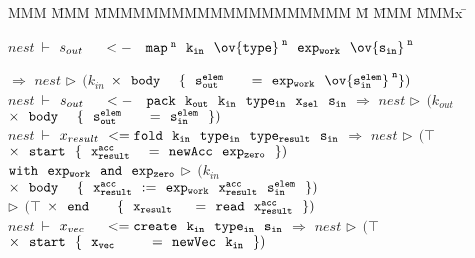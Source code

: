 \begin{tabbing}
MMM \= MMM \= MMMMMMMMMMMMMMMMMMMM \= M \= MMM \= MMMx \= \kill

 \> $nest~ \vdash$    
        \> $s_{out} ~~~~~\tt{<-}
                ~~~ \tt{map}^{\;n}
                        ~~ k_{in}
                        ~~ \ov{type}^{\;n}
                        ~~ exp_{work}
                        ~~ \ov{s_{in}}^{\;n}$

\> $\Rightarrow$ 
        \> $nest$
        \> $\rhd~~ (k_{in}$
        \> $\times~~ \tt{body}~~~~ 
                \{~~ s^{elem}_{out} ~~~~~~\tt{=}~~ exp_{work}~~ \ov{s^{elem}_{in}}^{\;n} \} )$ 
\\[1em]


 \> $nest~ \vdash$
        \> $s_{out} ~~~~~\tt{<-}
               ~~~ \tt{pack} 
                       ~~ k_{out}
                       ~~ k_{in}
                       ~~ type_{in}
                       ~~ x_{sel}
                       ~~ s_{in}$
\> $\Rightarrow$
        \> $nest$
        \> $\rhd~~ (k_{out}$
        \> $\times~~ \tt{body}~~~~ 
                \{~~ s^{elem}_{out} ~~~~~~\tt{=}~~ s^{elem}_{in} ~~\})$
\\[1em]


 \> $nest~ \vdash$
        \> $x_{result}~~  
                        \tt{<= fold}~~ k_{in}~~ type_{in}~~ type_{result}~~ s_{in}$ 
 \> $\Rightarrow$
        \> $nest$
        \> $\rhd~~ (\top$
        \> $\times~~ \tt{start}~~   
                \{~~ x^{acc}_{result} ~~~~\tt{=}~~ \tt{newAcc}~~ exp_{zero} ~~\})$
 \\[0.5ex]     


 \>     \> \hspace{5em} $\tt{with}   ~~ exp_{work}
                      ~~ \tt{and}    ~~ exp_{zero}$
 \>     \> 
        \> $\rhd~~ (k_{in}$
        \> $\times~~ \tt{body}~~~~    
                \{~~ x^{acc}_{result}~~ \tt{:=}~~ exp_{work}~~ x^{acc}_{result}~~ s^{elem}_{in} ~~\})$
 \\[0.5ex]


 \>     \>
 \>     \> 
        \> $\rhd~~ (\top$
        \> $\times~~ \tt{end}~~~~~~ 
                \{~~ x_{result}~~~~~ \tt{=}~~ \tt{read}~~ x^{acc}_{result} ~~\})$
 \\[1em]


 \> $nest~ \vdash$    
        \> $x_{vec}~~~~~
                        \tt{<= create}~~ k_{in}~~ type_{in}~~ s_{in}$
 \> $\Rightarrow$
        \> $nest$
        \> $\rhd~~ (\top$
        \> $\times~~ \tt{start}~~
                \{~~ x_{vec}~~~~~~~~ \tt{=}~~ \tt{newVec}~~ k_{in} ~~\})$
 \\[0.5ex]


\end{tabbing}
